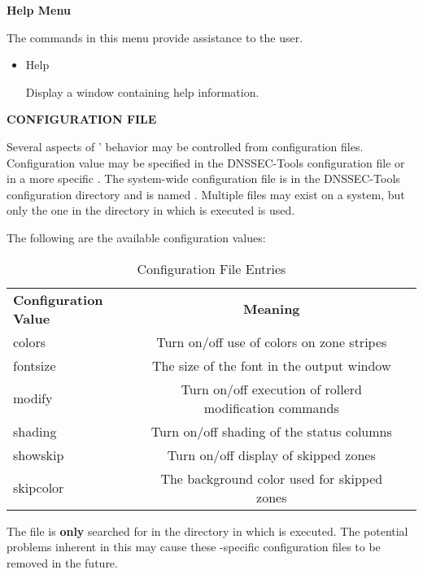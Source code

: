{\bf Help Menu}

The commands in this menu provide assistance to the user.

\begin{itemize}

\item Help\verb" "

Display a window containing help information.

\end{itemize}

{\bf CONFIGURATION FILE}

Several aspects of ' behavior may be controlled from
configuration files.  Configuration value may be specified in the DNSSEC-Tools
configuration file or in a more specific .  The
system-wide  configuration file is in the DNSSEC-Tools
configuration directory and is named .  Multiple
 files may exist on a system, but only the one in the
directory in which  is executed is used.

The following are the available configuration values:

\begin{table}[ht]
\begin{center}
\begin{tabular}{|l|c|l|}
\hline
{\bf Configuration Value} & {\bf Meaning} \\
colors    & Turn on/off use of colors on zone stripes \\
fontsize  & The size of the font in the output window \\
modify    & Turn on/off execution of rollerd modification commands \\
shading   & Turn on/off shading of the status columns \\
showskip  & Turn on/off display of skipped zones \\
skipcolor & The background color used for skipped zones \\
\hline
\end{tabular}
\end{center}
\caption{ Configuration File Entries}
\end{table}

The  file is {\bf only} searched for in the directory
in which  is executed.  The potential problems inherent in
this may cause these -specific configuration files to be
removed in the future.

